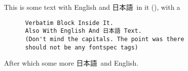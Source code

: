 ﻿\documentclass[12pt]{article}
\begin{document}
    \fontspec{\unicodegroupLatinFont}This is some text with English and
    \fontspec{\unicodegroupCJKFont}日本語\fontspec{\unicodegroupLatinFont}\ in it (), with a
    \begin{verbatim}
      Verbatim Block Inside It.
      Also With English And 日本語 Text.
      (Don't mind the capitals. The point was there
      should not be any fontspec tags)
    \end{verbatim}
    After which some more \fontspec{\unicodegroupCJKFont}日本語\fontspec{\unicodegroupLatinFont}\ and English.
  

  
\end{document}

